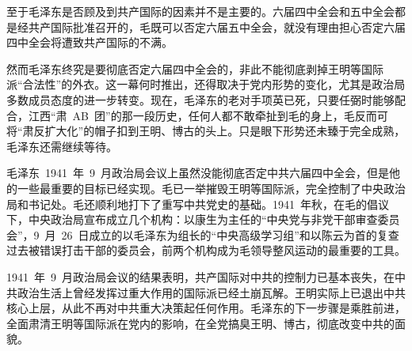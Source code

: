 至于毛泽东是否顾及到共产国际的因素并不是主要的。六届四中全会和五中全会都是经共产国际批准召开的，毛既可以否定六届五中全会，就没有理由担心否定六届四中全会将遭致共产国际的不满。

然而毛泽东终究是要彻底否定六届四中全会的，非此不能彻底剥掉王明等国际派“合法性”的外衣。这一幕何时推出，还得取决于党内形势的变化，尤其是政治局多数成员态度的进一步转变。现在，毛泽东的老对手项英已死，只要任弼时能够配合，江西“肃~AB~团”的那一段历史，任何人都不敢牵扯到毛的身上，毛反而可将“肃反扩大化”的帽子扣到王明、博古的头上。只是眼下形势还未臻于完全成熟，毛泽东还需继续等待。

毛泽东~1941~年~9~月政治局会议上虽然没能彻底否定中共六届四中全会，但是他的一些最重要的目标已经实现。毛已一举摧毁王明等国际派，完全控制了中央政治局和书记处。毛还顺利地打下了重写中共党史的基础。1941~年秋，在毛的倡议下，中央政治局宣布成立几个机构：以康生为主任的“中央党与非党干部审查委员会”，9~月~26~日成立的以毛泽东为组长的“中央高级学习组”和以陈云为首的复查过去被错误打击干部的委员会，前两个机构成为毛领导整风运动的最重要的工具。

1941~年~9~月政治局会议的结果表明，共产国际对中共的控制力已基本丧失，在中共政治生活上曾经发挥过重大作用的国际派已经土崩瓦解。王明实际上已退出中共核心上层，从此不再对中共重大决策起任何作用。毛泽东的下一步骤是乘胜前进，全面肃清王明等国际派在党内的影响，在全党搞臭王明、博古，彻底改变中共的面貌。